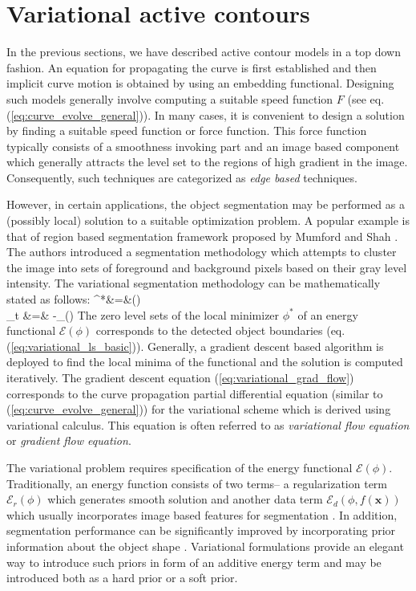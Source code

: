 \section{Variational active contours}

In the previous sections, we have described active contour models in a top down fashion. An equation for propagating the curve is first established and then implicit curve motion is obtained by using an embedding functional. Designing such models generally involve computing a suitable speed function $F$ (see eq. (\ref{eq:curve_evolve_general})). In many cases, it is convenient to design a solution by finding a suitable speed function or force function. This force function typically consists of a smoothness invoking part and an image based component which generally attracts the level set to the regions of high gradient in the image\cite{malladi_sethian,caselles_geodesic}. Consequently, such techniques are categorized as  \textit{edge based} techniques.

However, in certain applications, the object segmentation may be performed as a (possibly local) solution to a suitable optimization problem. A popular example is that of region based segmentation framework proposed by Mumford and Shah \cite{mumford_shah}. The authors introduced a segmentation methodology which attempts to cluster the image into sets of foreground and background pixels based on their gray level intensity.
The variational segmentation methodology can be mathematically stated as follows:
\bea
\phi^*&=&\underset{\phi}{\arg\!\min}\;(\phi) \label{eq:variational_ls_basic}
\\
\phi_t &=& -\nabla_{\phi}\;(\phi)
\label{eq:variational_grad_flow}
\eea
The zero level sets of the local minimizer $\phi^*$ of an energy functional $\mathcal{E}(\phi)$ corresponds to the detected object boundaries (eq. (\ref{eq:variational_ls_basic})). Generally, a gradient descent based algorithm is deployed to find the local minima of the functional and the solution is computed iteratively. The gradient descent equation (\ref{eq:variational_grad_flow}) corresponds to the curve propagation partial differential equation (similar to (\ref{eq:curve_evolve_general})) for the variational scheme which is derived using variational calculus\cite{calc_of_var}. This equation is often referred to as \textit{variational flow equation} or \textit{gradient flow equation}. 

The variational problem requires specification of the energy functional $\mathcal{E}(\phi)$. Traditionally, an energy function consists of two terms-- a regularization term $\mathcal{E}_r(\phi)$ which generates smooth solution and another data term $\mathcal{E}_d(\phi,f(\textbf{x}))$ which usually incorporates image based features for segmentation \cite{zhao_variational,chan_vese,bernard_splinedCV,lankton_localCV}. In addition, segmentation performance can be significantly improved by incorporating prior information about the object shape . Variational formulations provide an elegant way to introduce such priors in form of an additive energy term and may be introduced both as a hard prior\cite{chan_LS_shape,cremers2007review,foulonneau2006affine,gooya2008variational} or a soft prior\cite{nain2004vessel}.

